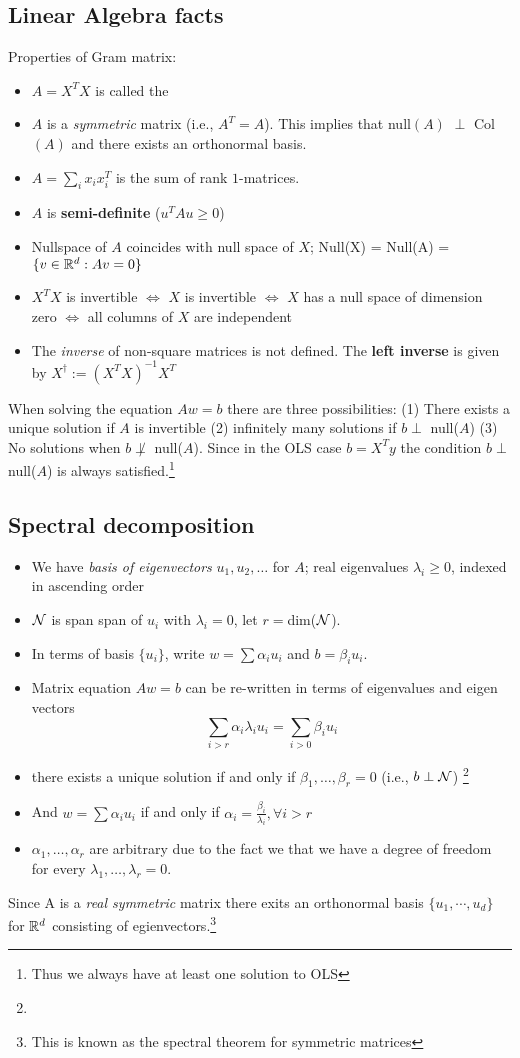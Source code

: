 \subsection{Linear Algebra facts}
Properties of Gram matrix:
\begin{itemize}
    \item $A = X^T X$ is called the 
    \item $A$ is a \textit{symmetric} matrix (i.e., $A^T = A$). This implies that null$(A)$ $\perp$ Col$(A)$ and there exists an orthonormal basis.
    \item $A = \sum_{i}x_ix_{i}^T$ is the sum of rank $1$-matrices.
    \item $A$ is \textbf{semi-definite} ($u^TAu \geq 0$)
    \item Nullspace of $A$ coincides with null space of $X$; Null(X) = Null(A) = $\{v \in \mathbb R^d : Av =0\}$
    \item $X^T X$ is invertible $\iff$ $X$ is invertible $\iff$ $X$ has a null space of dimension zero $\iff$ all columns of $X$ are independent
    \item The \textit{inverse} of non-square matrices is not defined. The \textbf{left inverse} is given by $X^{\dag} := (X^TX)^{-1}X^T $
\end{itemize}
When solving the equation $Aw =b$ there are three possibilities: (1) There exists a unique solution if $A$ is invertible (2) infinitely many solutions if $b \perp$ null($A$) (3) No solutions when $b \not\perp$ null($A$). Since in the OLS case $b = X^Ty$ the condition $b \perp$ null($A$) is always satisfied.\footnote{Thus we always have at least one solution to OLS}
\subsection{Spectral decomposition}
\begin{itemize}
    \item We have \textit{basis of eigenvectors} $u_1, u_2, \dots$ for $A$; 
    real eigenvalues $\lambda_i \geq 0$, indexed in ascending order
    \item $\mathcal N$ is span span of $u_i$ with $\lambda_i = 0$, let $r =$dim($\mathcal N$).
    \item In terms of basis $\{u_i\}$, write $w = \sum \alpha_i u_i$ and $b = \beta_i u_i$.
    \item Matrix equation $Aw = b$ can be re-written in terms of eigenvalues and eigen vectors
        $$
        \sum_{i > r} \alpha_i \lambda_i u_i = \sum_{i > 0} \beta_i u_i 
        $$
    \item there exists a unique solution if and only if $\beta_1, \dots, \beta_r = 0$ 
    (i.e., $b \perp \mathcal N$) \footnote{}

    \item And $w = \sum \alpha_i u_i$ if and only if $\alpha_i = \frac{\beta_i}{\lambda_i}, \forall i > r$
    
    \item $\alpha_1, \dots, \alpha_r$ are arbitrary due to the fact we that we have a degree of freedom for every $\lambda_1, \dots, \lambda_r = 0$.
\end{itemize}

Since A is a \textit{real symmetric} matrix there exits an orthonormal basis $\{u_1, \cdots, u_d\}$ for $\mathbb R^d$ consisting of egienvectors.\footnote{This is known as the spectral theorem for symmetric matrices}

 